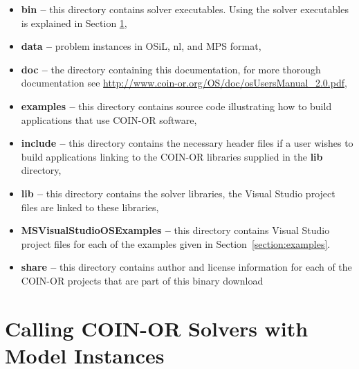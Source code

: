 \documentclass[11pt]{article}
\renewcommand{\{}{{\char"7B}}
\renewcommand{\}}{{\char"7D}}
\renewcommand{\^}{{\char"0D}}
\renewcommand{\'}{{\char"0D}}
\begin{document}
\begin{itemize}
\item {\bf bin --} this directory contains  solver executables. Using the solver executables is 
explained in Section \ref{section:callingsolvers},

\item {\bf data --} problem instances in OSiL, nl, and MPS format,

\item {\bf doc --} the directory containing this documentation, for more thorough documentation
see \url{http://www.coin-or.org/OS/doc/osUsersManual_2.0.pdf},


\item {\bf examples --} this directory contains source code illustrating how to build applications 
that use COIN-OR software, 

\item {\bf include -- } this directory contains the necessary header files if a user wishes 
to build applications linking to the COIN-OR libraries supplied in the {\bf lib} directory,

\item {\bf lib --} this directory contains the solver libraries, the Visual Studio project files 
are linked to these libraries,


\item {\bf MSVisualStudioOSExamples -- } this directory contains Visual Studio  project files for 
each of the examples given  in Section~\ref{section:examples}.


\item {\bf share --}  this directory contains author and license information for each of the  
COIN-OR projects that are part of this binary download
\end{itemize}

\section{Calling COIN-OR Solvers with Model Instances}\label{section:callingsolvers}
\end{document}
